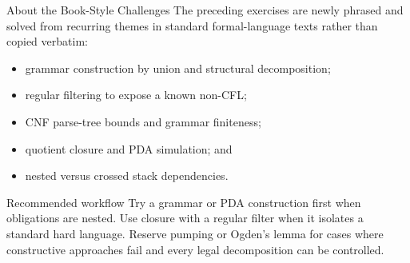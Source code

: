 \documentclass[10pt]{beamer}
\begin{document}
\begin{frame}{About the Book-Style Challenges}
  \small
  The preceding exercises are newly phrased and solved from recurring themes
  in standard formal-language texts rather than copied verbatim:
  \begin{itemize}
    \item grammar construction by union and structural decomposition;
    \item regular filtering to expose a known non-CFL;
    \item CNF parse-tree bounds and grammar finiteness;
    \item quotient closure and PDA simulation; and
    \item nested versus crossed stack dependencies.
  \end{itemize}
  \pause
  \begin{block}{Recommended workflow}
    Try a grammar or PDA construction first when obligations are nested. Use
    closure with a regular filter when it isolates a standard hard language.
    Reserve pumping or Ogden's lemma for cases where constructive approaches
    fail and every legal decomposition can be controlled.
  \end{block}
\end{frame}
\end{document}
